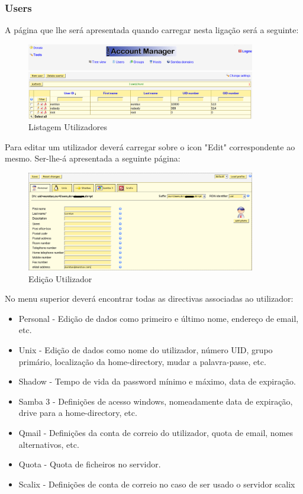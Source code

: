 \subsubsection{Users}

A página que lhe será apresentada quando carregar nesta ligação será a seguinte:

\begin{figure}[H]
    \begin{center}
        \includegraphics[width=10cm]{include/img/lam2}
    \end{center}
    \caption{Listagem Utilizadores}
    \label{fig:LAM2}
\end{figure}

Para editar um utilizador deverá carregar sobre o icon "Edit" correspondente ao mesmo. Ser-lhe-á apresentada a seguinte página:

\begin{figure}[H]
    \begin{center}
        \includegraphics[width=10cm]{include/img/lam4}
    \end{center}
    \caption{Edição Utilizador}
    \label{fig:LAM4}
\end{figure}

No menu superior deverá encontrar todas as directivas associadas ao utilizador:

\begin{itemize}
\item Personal - Edição de dados como primeiro e último nome, endereço de email, etc.
\item Unix - Edição de dados como nome do utilizador, número UID, grupo primário, localização da home-directory, mudar a palavra-passe, etc.
\item Shadow - Tempo de vida da password mínimo e máximo, data de expiração.
\item Samba 3 - Definições de acesso windows, nomeadamente data de expiração, drive para a home-directory, etc.
\item Qmail - Definições da conta de correio do utilizador, quota de email, nomes alternativos, etc.
\item Quota - Quota de ficheiros no servidor.
\item Scalix - Definições de conta de correio no caso de ser usado o servidor scalix
\end{itemize}

